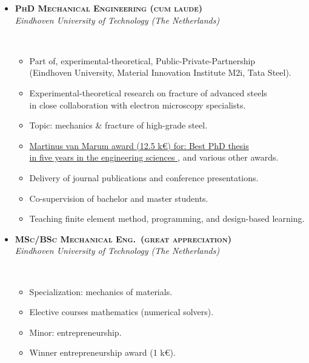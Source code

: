 \documentclass[11pt, a4paper]{article}
\newcommand{\dates}[1]{\hfill\mbox{\textbf{#1}}} %
\newcommand{\smaller}[1]{{\small\ #1}}
\begin{document}
\begin{minipage}[t]{0.56\textwidth}
    \begin{itemize}
        \item
        \textbf{\textsc{PhD Mechanical Engineering (cum laude)}} \dates{\MyDatePhD}
        \vspace*{0.1eM}
        \\
        \textit{Eindhoven University of Technology (The Netherlands)}
        \vspace*{0.2eM}
        \smaller{%
            \begin{itemize}
                \item Part of, experimental-theoretical, Public-Private-Partnership \\
                (Eindhoven University, Material Innovation Institute M2i, Tata Steel).
                \item Experimental-theoretical research on fracture of advanced steels\\
                in close collaboration with electron microscopy specialists.
                \item Topic: mechanics \& fracture of high-grade steel.
                \item \href{https://www.geus.me/education.html\#doctor-of-philosophy}{
                    Martinus van Marum award (12.5 k\euro) for:
                    Best PhD thesis\\in five years in the engineering sciences%
                }, and various other awards.
                \item Delivery of journal publications and conference presentations.
                \item Co-supervision of bachelor and master students.
                \item Teaching finite element method, programming, and design-based learning.
            \end{itemize}
        }
        \vspace*{0.2eM}
        \item
        \textbf{\textsc{MSc/BSc Mechanical Eng.~(great appreciation)}} \dates{\MyDateBScMSc}
        \vspace*{0.1eM}
        \\
        \textit{Eindhoven University of Technology (The Netherlands)}
        \vspace*{0.2eM}
        \smaller{%
            \begin{itemize}
                \item Specialization: mechanics of materials.
                \item Elective courses mathematics (numerical solvers).
                \item Minor: entrepreneurship.
                \item Winner entrepreneurship award (1 k\euro).
            \end{itemize}
        }
        \vspace*{0.2eM}
    \end{itemize}

\end{minipage}
\end{document}
